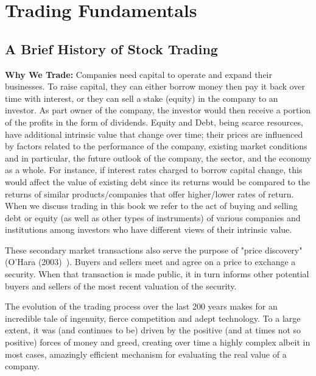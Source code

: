 \chapter{Trading Fundamentals\label{chap:ch_trading_fund}}
\section{A Brief History of Stock Trading}

\noindent\textbf{Why We Trade:} Companies need capital to operate and expand their businesses. To raise capital, they can either borrow money then pay it back over time with interest, or they can sell a stake (equity) in the company to an investor. As part owner of the company, the investor would then receive a portion of the profits in the form of dividends. Equity and Debt, being scarce resources, have additional intrinsic value that change over time; their prices are influenced by factors related to the performance of the company, existing market conditions and in particular, the future outlook of the company, the sector, and the economy as a whole. For instance, if interest rates charged to borrow capital change, this would affect the value of existing debt since its returns would be compared to the returns of similar products/companies that offer higher/lower rates of return. When we discuss trading in this book we refer to the act of buying and selling debt or equity (as well as other types of instruments) of various companies and institutions among investors who have different views of their intrinsic value.

These secondary market transactions also serve the purpose of "price discovery" (O'Hara (2003)~\cite{ohara}). Buyers and sellers meet and agree on a price to exchange a security. When that transaction is made public, it in turn informs other potential buyers and sellers of the most recent valuation of the security.  

The evolution of the trading process  over the last 200 years makes for an incredible tale of ingenuity, fierce competition and adept technology. To a large extent, it was (and continues to be) driven by the positive (and at times not so positive) forces of money and greed, creating over time a highly complex albeit in most cases, amazingly efficient mechanism for evaluating the real value of a company. \twomedskip


